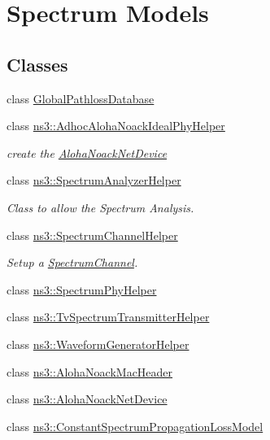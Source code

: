 \hypertarget{group__spectrum}{}\section{Spectrum Models}
\label{group__spectrum}
\subsection*{Classes}
\begin{DoxyCompactItemize}
\item 
class \hyperlink{classGlobalPathlossDatabase}{Global\+Pathloss\+Database}
\item 
class \hyperlink{classns3_1_1AdhocAlohaNoackIdealPhyHelper}{ns3\+::\+Adhoc\+Aloha\+Noack\+Ideal\+Phy\+Helper}
\begin{DoxyCompactList}\small\item\em create the \hyperlink{classns3_1_1AlohaNoackNetDevice}{Aloha\+Noack\+Net\+Device} \end{DoxyCompactList}\item 
class \hyperlink{classns3_1_1SpectrumAnalyzerHelper}{ns3\+::\+Spectrum\+Analyzer\+Helper}
\begin{DoxyCompactList}\small\item\em Class to allow the Spectrum Analysis. \end{DoxyCompactList}\item 
class \hyperlink{classns3_1_1SpectrumChannelHelper}{ns3\+::\+Spectrum\+Channel\+Helper}
\begin{DoxyCompactList}\small\item\em Setup a \hyperlink{classns3_1_1SpectrumChannel}{Spectrum\+Channel}. \end{DoxyCompactList}\item 
class \hyperlink{classns3_1_1SpectrumPhyHelper}{ns3\+::\+Spectrum\+Phy\+Helper}
\item 
class \hyperlink{classns3_1_1TvSpectrumTransmitterHelper}{ns3\+::\+Tv\+Spectrum\+Transmitter\+Helper}
\item 
class \hyperlink{classns3_1_1WaveformGeneratorHelper}{ns3\+::\+Waveform\+Generator\+Helper}
\item 
class \hyperlink{classns3_1_1AlohaNoackMacHeader}{ns3\+::\+Aloha\+Noack\+Mac\+Header}
\item 
class \hyperlink{classns3_1_1AlohaNoackNetDevice}{ns3\+::\+Aloha\+Noack\+Net\+Device}
\item 
class \hyperlink{classns3_1_1ConstantSpectrumPropagationLossModel}{ns3\+::\+Constant\+Spectrum\+Propagation\+Loss\+Model}

\end{DoxyCompactItemize}
